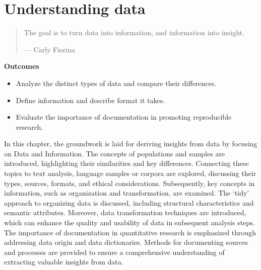 \documentclass[
  letterpaper,
]{latex/krantz}
\providecommand{\tightlist}{%
  \setlength{\itemsep}{0pt}\setlength{\parskip}{0pt}}\usepackage{longtable,booktabs,array}
\begin{document}
\hypertarget{sec-understanding-data}{%
\chapter{Understanding data}\label{sec-understanding-data}}

\begin{quote}
The goal is to turn data into information, and information into insight.

--- Carly Fiorina
\end{quote}

\begin{tcolorbox}[enhanced jigsaw, arc=.35mm, leftrule=.75mm, rightrule=.15mm, opacityback=0, colback=white, breakable, bottomrule=.15mm, left=2mm, toprule=.15mm]

\textbf{ Outcomes}

\begin{itemize}
\tightlist
\item
  Analyze the distinct types of data and compare their differences.
\item
  Define information and describe format it takes.
\item
  Evaluate the importance of documentation in promoting reproducible
  research.
\end{itemize}

\end{tcolorbox}

In this chapter, the groundwork is laid for deriving insights from data
by focusing on Data and Information. The concepts of populations and
samples are introduced, highlighting their similarities and key
differences. Connecting these topics to text analysis, language samples
or corpora are explored, discussing their types, sources, formats, and
ethical considerations. Subsequently, key concepts in information, such
as organization and transformation, are examined. The `tidy' approach to
organizing data is discussed, including structural characteristics and
semantic attributes. Moreover, data transformation techniques are
introduced, which can enhance the quality and usability of data in
subsequent analysis steps. The importance of documentation in
quantitative research is emphasized through addressing data origin and
data dictionaries. Methods for documenting sources and processes are
provided to ensure a comprehensive understanding of extracting valuable
insights from data.
\end{document}
